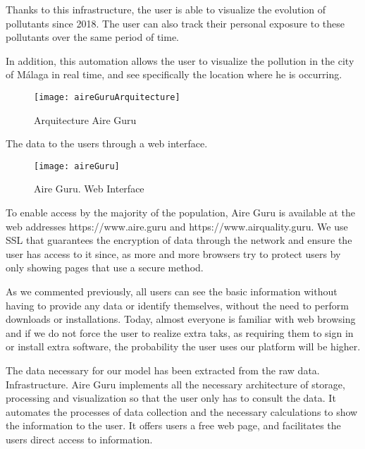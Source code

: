 Thanks to this infrastructure, the user is able to visualize the evolution of pollutants since 2018. The user can also track their personal exposure
 to these pollutants over the same period of time.

In addition, this automation allows the user to visualize the pollution in the city of Málaga in real time, and see specifically the location where he is 
occurring. \\

\begin{figure}[ht]
    \centering
    \texttt{[image: aireGuruArquitecture]}
    \caption{Arquitecture Aire Guru}
\end{figure}

The data to the users through a web interface. \\

\begin{figure}[ht]
    \centering
    \texttt{[image: aireGuru]}
    \caption{Aire Guru. Web Interface}
\end{figure}

To enable access by the majority of the population, Aire Guru is available at the web addresses https://www.aire.guru and https://www.airquality.guru.
We use SSL that guarantees the encryption of data through the network and ensure the user has access to it since, as more and more browsers try to protect 
users by only showing pages that use a secure method.

As we commented previously, all users can see the basic information without having to provide any data or identify themselves, without the need to
perform downloads or installations. Today, almost everyone is familiar with web browsing and if we do not force the user to realize extra taks, as 
requiring them to sign in or install extra software, the probability the user uses our platform will be higher. 

\begin{itemize}
\done The data necessary for our model has been extracted from the raw data.
\done Infrastructure. Aire Guru implements all the necessary architecture of storage, processing and visualization so that the user only has to consult
the data.
\done It automates the processes of data collection and the necessary calculations to show the information to the user.
\done It offers users a free web page, and facilitates the users direct access to information.
\end{itemize}